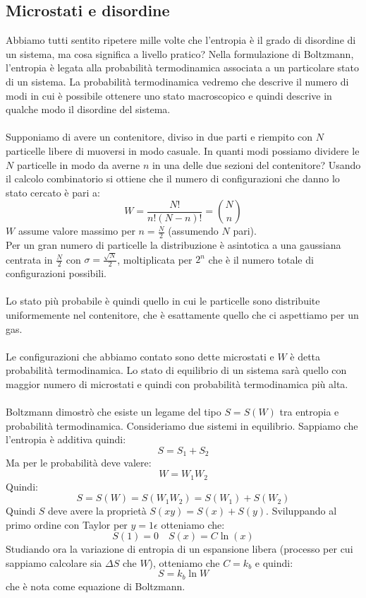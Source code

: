 \documentclass{article}
\begin{document}
\subsection{Microstati e disordine}
Abbiamo tutti sentito ripetere mille volte che l'entropia è il grado di disordine di un sistema, ma cosa significa a livello pratico? Nella formulazione di Boltzmann, l'entropia è legata alla probabilità termodinamica associata a un particolare stato di un sistema. La probabilità termodinamica vedremo che descrive il numero di modi in cui è possibile ottenere uno stato macroscopico e quindi descrive in qualche modo il disordine del sistema.\\\\
Supponiamo di avere un contenitore, diviso in due parti e riempito con $N$ particelle libere di muoversi in modo casuale. In quanti modi possiamo dividere le $N$ particelle in modo da averne $n$ in una delle due sezioni del contenitore? Usando il calcolo combinatorio si ottiene che il numero di configurazioni che danno lo stato cercato è pari a:
$$ W = \frac{N!}{n!(N-n)!} = \binom{N}{n} $$
$W$ assume valore massimo per $n=\frac{N}{2}$ (assumendo $N$ pari).\\
Per un gran numero di particelle la distribuzione è asintotica a una gaussiana centrata in $\frac{N}{2}$ con $\sigma=\frac{\sqrt{N}}{2}$, moltiplicata per $2^n$ che è il numero totale di configurazioni possibili.\\\\
Lo stato più probabile è quindi quello in cui le particelle sono distribuite uniformemente nel contenitore, che è esattamente quello che ci aspettiamo per un gas.\\\\
Le configurazioni che abbiamo contato sono dette microstati e $W$ è detta probabilità termodinamica. Lo stato di equilibrio di un sistema sarà quello con maggior numero di microstati e quindi con probabilità termodinamica più alta.\\\\
Boltzmann dimostrò che esiste un legame del tipo $S=S(W)$ tra entropia e probabilità termodinamica. Consideriamo due sistemi in equilibrio. Sappiamo che l'entropia è additiva quindi:
$$ S = S_1+S_2 $$
Ma per le probabilità deve valere:
$$ W = W_1W_2 $$
Quindi:
$$ S = S(W) = S(W_1W_2) = S(W_1) + S(W_2) $$
Quindi $S$ deve avere la proprietà $S(xy) = S(x) + S(y)$. Sviluppando al primo ordine con Taylor per $y=1\epsilon$ otteniamo che:
$$ S(1)=0 \quad S(x) = C\ln(x) $$
Studiando ora la variazione di entropia di un espansione libera (processo per cui sappiamo calcolare sia $\Delta S$ che $W$), otteniamo che $C=k_b$ e quindi:
$$ S = k_b\ln W $$
che è nota come equazione di Boltzmann.







\Index
\end{document}
